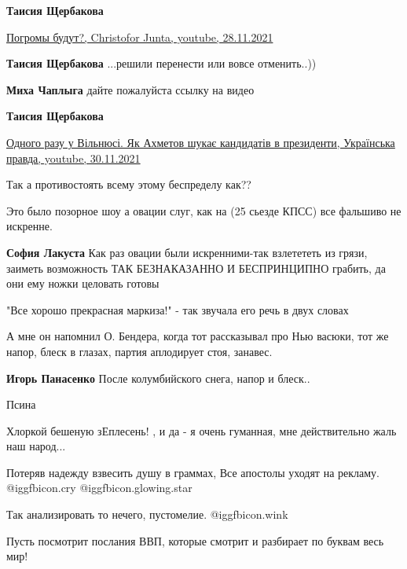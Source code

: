 \begin{itemize}
\begin{itemize}
\textbf{Таисия Щербакова}

\href{https://www.youtube.com/watch?v=b5Xpdc-WCgg}{%
Погромы будут?, Christofor Junta, youtube, 28.11.2021%
}

\textbf{Таисия Щербакова} ...решили перенести или вовсе отменить..))

\textbf{Миха Чаплыга} дайте пожалуйста ссылку на видео

\textbf{Таисия Щербакова} 

\href{https://youtu.be/jci47lqpMJU}{%
Одного разу у Вільнюсі. Як Ахметов шукає кандидатів в президенти, Українська правда, youtube, 30.11.2021%
}

\end{itemize} %

Так а противостоять всему этому беспределу как??

Это было позорное шоу а овации слуг, как на (25 сьезде КПСС) все фальшиво не искренне.

\begin{itemize} %
\textbf{София Лакуста} Как раз овации были искренними-так взлетететь из грязи, заиметь возможность ТАК БЕЗНАКАЗАННО И БЕСПРИНЦИПНО грабить, да они ему ножки целовать готовы
\end{itemize} %

"Все хорошо прекрасная маркиза!" - так звучала его речь в двух словах

А мне он напомнил О. Бендера, когда тот рассказывал про Нью васюки, тот же напор, блеск в глазах, партия аплодирует стоя, занавес.

\begin{itemize} %
\textbf{Игорь Панасенко} После колумбийского снега, напор и блеск..
\end{itemize} %

Псина

Хлоркой бешеную зЕплесень! , и да - я очень гуманная, мне действительно жаль наш народ...

Потеряв надежду взвесить душу в граммах,
Все апостолы уходят на рекламу. @igg{fbicon.cry}  @igg{fbicon.glowing.star} 

Так анализировать то нечего, пустомелие.  @igg{fbicon.wink} 

Пусть посмотрит послания ВВП, которые смотрит и разбирает по буквам весь мир!


\end{itemize}
